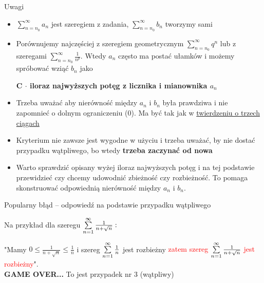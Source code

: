 Uwagi

\begin{itemize}
    \item $ \sum\limits_{n = n_0}^{\infty} a_n $ jest szeregiem z zadania, $ \sum\limits_{n = n_0}^{\infty} b_n $ tworzymy sami
    \item Porównujemy najczęściej z szeregiem geometrycznym $ \sum\limits_{n = n_0}^{\infty} q^n $ lub z szeregami
    $ \sum\limits_{n = n_0}^{\infty} \frac{1}{n^p} $. Wtedy $a_n$ często ma postać ułamków i możemy spróbować wziąć $b_n$ jako

    \quad \textbf{C $\cdot$ iloraz najwyższych potęg z licznika i mianownika $a_n$} 

    \item Trzeba uważać aby nierówność między $a_n$ i $b_n$ była prawdziwa i nie zapomnieć o dolnym ograniczeniu (0). Ma być
    tak jak w \underline{twierdzeniu o trzech ciągach}

    \item Kryterium nie zawsze jest wygodne w użyciu i trzeba uważać, by nie dostać przypadku wątpliwego, bo wtedy \textbf{trzeba zaczynać od nowa}
    
    \item Warto sprawdzić opisany wyżej iloraz najwyższych potęg i na tej podstawie przewidzieć czy chcemy udowodnić zbieżność
    czy rozbieżność. To pomaga skonstruować odpowiednią nierówność między $a_n$ i $b_n$.
\end{itemize}
\bigskip

\begin{blad}{Popularny błąd -- odpowiedź na podstawie przypadku wątpliwego } 

Na przykład dla szeregu $ \sum\limits_{n = 1}^{\infty} \frac{1}{n + \sqrt{n}} : $

"Mamy $ 0 \leq \frac{1}{n + \sqrt{n}} \leq \frac{1}{n} $ i szereg $ \sum\limits_{n = 1}^{\infty} \frac{1}{n} $
jest rozbieżny \textcolor{red}{zatem szereg $\sum\limits_{n = 1}^{\infty} \frac{1}{n + \sqrt{n}}$ jest rozbieżny}". \\

\textbf{GAME OVER...} To jest przypadek nr 3 (wątpliwy)
\end{blad}

